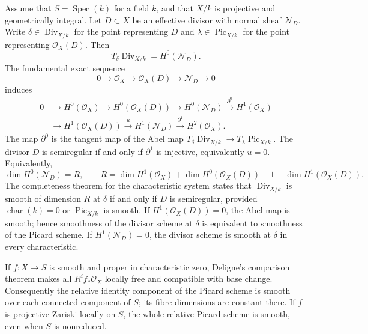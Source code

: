 \begin{remark}\label{fga-rem-9-5-18}\uses{}
Assume that $S=\operatorname{Spec}(k)$ for a field $k$, and that $X/k$ is
projective and geometrically integral.  Let $D\subset X$ be an effective
divisor with normal sheaf $\mathcal N_D$.  Write
$\delta\in\operatorname{Div}_{X/k}$ for the point representing $D$ and
$\lambda\in\operatorname{Pic}_{X/k}$ for the point representing
$\mathcal O_X(D)$.  Then
\[
T_\delta\operatorname{Div}_{X/k}=H^0(\mathcal N_D).
\]
The fundamental exact sequence
\[
0\longrightarrow\mathcal O_X\longrightarrow\mathcal O_X(D)
\longrightarrow\mathcal N_D\longrightarrow0
\]
induces
\[
\begin{aligned}
0&\longrightarrow H^0(\mathcal O_X)\longrightarrow H^0(\mathcal O_X(D))
\longrightarrow H^0(\mathcal N_D)\xrightarrow{\partial^0}H^1(\mathcal O_X)\\
&\longrightarrow H^1(\mathcal O_X(D))\xrightarrow{u}H^1(\mathcal N_D)
\xrightarrow{\partial^1}H^2(\mathcal O_X).
\end{aligned}
\]
The map $\partial^0$ is the tangent map of the Abel map
$T_\delta\operatorname{Div}_{X/k}\to T_\lambda\operatorname{Pic}_{X/k}$.
The divisor $D$ is semiregular if and only if $\partial^1$ is injective,
equivalently $u=0$.  Equivalently,
\[
\dim H^0(\mathcal N_D)=R,\qquad
R=\dim H^1(\mathcal O_X)+\dim H^0(\mathcal O_X(D))-1
 -\dim H^1(\mathcal O_X(D)).
\]
The completeness theorem for the characteristic system states that
$\operatorname{Div}_{X/k}$ is smooth of dimension $R$ at $\delta$ if and only if
$D$ is semiregular, provided $\operatorname{char}(k)=0$ or
$\operatorname{Pic}_{X/k}$ is smooth.  If $H^1(\mathcal O_X(D))=0$, the Abel map
is smooth; hence smoothness of the divisor scheme at $\delta$ is equivalent to
smoothness of the Picard scheme.  If $H^1(\mathcal N_D)=0$, the divisor scheme
is smooth at $\delta$ in every characteristic.
\end{remark}

\begin{remark}\label{fga-rem-9-5-21}\uses{}
If $f:X\to S$ is smooth and proper in characteristic zero, Deligne's comparison
theorem makes all $R^if_*\mathcal O_X$ locally free and compatible with base
change.  Consequently the relative identity component of the Picard scheme is
smooth over each connected component of $S$; its fibre dimensions are constant
there.  If $f$ is projective Zariski-locally on $S$, the whole relative Picard
scheme is smooth, even when $S$ is nonreduced.
\end{remark}

